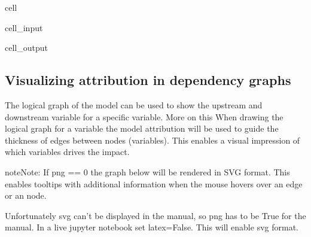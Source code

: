 \documentclass[letterpaper,10pt,english]{jupyterBook}
\begin{document}
\begin{sphinxuseclass}{cell}\begin{sphinxVerbatimInput}

\begin{sphinxuseclass}{cell_input}
\begin{sphinxVerbatim}[commandchars=\\\{\}]
   
\end{sphinxVerbatim}

\end{sphinxuseclass}\end{sphinxVerbatimInput}
\begin{sphinxVerbatimOutput}

\begin{sphinxuseclass}{cell_output}
\noindent{}

\end{sphinxuseclass}\end{sphinxVerbatimOutput}

\end{sphinxuseclass}

\subsection{Visualizing attribution in dependency graphs}
\label{\detokenize{content/06_ModelAnalytics/AttributionSomeFeatures:visualizing-attribution-in-dependency-graphs}}
\sphinxAtStartPar
The logical graph of the model can be used to show the upstream and downstream variable for a specific variable. More on this 
When drawing the logical graph for a variable the model attribution will be used to guide the thickness of edges between nodes (variables). This enables a visual impression of which
variables drives the impact.

\begin{sphinxadmonition}{note}{Note:}
\sphinxAtStartPar
If png == 0 the graph below will be rendered in SVG format. This enables tooltips with additional information when the mouse hovers
over an edge or an node.

\sphinxAtStartPar
Unfortunately svg can’t be displayed in the manual, so png has to be True for the manual. In a live jupyter notebook set latex=False. This will
enable svg format.
\end{sphinxadmonition}
\end{document}

